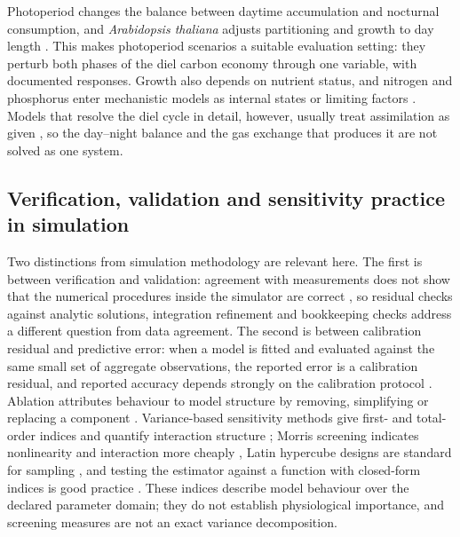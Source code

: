 Photoperiod changes the balance between daytime accumulation and nocturnal
consumption, and \textit{Arabidopsis thaliana} adjusts partitioning and growth
to day length \cite{Sulpice2014,Mengin2017,Annunziata2017}. This makes
photoperiod scenarios a suitable evaluation setting: they perturb both phases of
the diel carbon economy through one variable, with documented responses. Growth
also depends on nutrient status, and nitrogen and phosphorus enter mechanistic
models as internal states or limiting factors
\cite{Gastal2002,Xu2012,Barber1995,Shen2011,Carstensen2018}. Models that
resolve the diel cycle in detail, however, usually treat assimilation as given
\cite{Scialdone2013,Graf2010,Feugier2013}, so the day--night balance and the
gas exchange that produces it are not solved as one system.

\subsection{Verification, validation and sensitivity practice in simulation}

Two distinctions from simulation methodology are relevant here. The first is
between verification and validation: agreement with measurements does not show
that the numerical procedures inside the simulator are correct
\cite{Zeigler2000,Cellier1991}, so residual checks against analytic solutions,
integration refinement and bookkeeping checks address a different question from
data agreement. The second is between calibration residual and predictive
error: when a model is fitted and evaluated against the same small set of
aggregate observations, the reported error is a calibration residual, and
reported accuracy depends strongly on the calibration protocol
\cite{Maiorano2017,Wallach2018,Holzworth2014,Jones2003}. Ablation attributes
behaviour to model structure by removing, simplifying or replacing a component
\cite{Zeigler2000}. Variance-based sensitivity methods give first- and
total-order indices and quantify interaction structure
\cite{Sobol2001,Saltelli2010}; Morris screening indicates nonlinearity and
interaction more cheaply \cite{Morris1991,Campolongo2007}, Latin hypercube
designs are standard for sampling \cite{McKay1979}, and testing the estimator
against a function with closed-form indices is good practice
\cite{Ishigami1990}. These indices describe model behaviour over the declared
parameter domain; they do not establish physiological importance, and screening
measures are not an exact variance decomposition.

